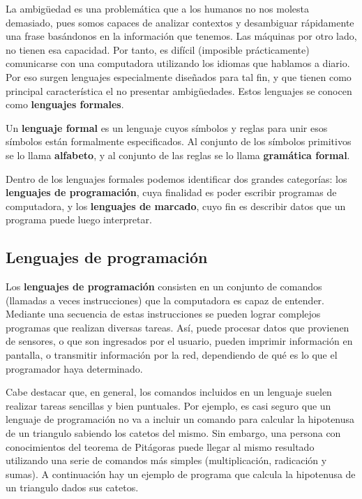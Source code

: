La ambigüedad es una problemática que a los humanos no nos molesta demasiado,
pues somos capaces de analizar contextos y desambiguar rápidamente una frase
basándonos en la información que tenemos. Las máquinas por otro lado, no tienen
esa capacidad. Por tanto, es difícil (imposible prácticamente) comunicarse con
una computadora utilizando los idiomas que hablamos a diario. Por eso surgen
lenguajes especialmente diseñados para tal fin, y que tienen como principal
característica el no presentar ambigüedades. Estos lenguajes se conocen como
\textbf{lenguajes formales}.

\begin{definition}
    Un \textbf{lenguaje formal} es un lenguaje cuyos símbolos y
    reglas para unir esos símbolos están formalmente especificados.
    Al conjunto de los símbolos primitivos se lo llama \textbf{alfabeto}, y
    al conjunto de las reglas se lo llama \textbf{gramática formal}.\autocite{sunitha_2015}
\end{definition}

Dentro de los lenguajes formales podemos identificar dos grandes categorías:
los \textbf{lenguajes de programación}, cuya finalidad es poder escribir programas de
computadora, y los \textbf{lenguajes de marcado}, cuyo fin es describir datos que un 
programa puede luego interpretar.

\subsection{Lenguajes de programación}

Los \textbf{lenguajes de programación} consisten en un conjunto de comandos (llamadas
a veces instrucciones) que la computadora es capaz de entender. Mediante una
secuencia de estas instrucciones se pueden lograr complejos programas que
realizan diversas tareas. Así, puede procesar datos que provienen de sensores,
o que son ingresados por el usuario, pueden imprimir información en pantalla,
o transmitir información por la red, dependiendo de qué es lo que el programador
haya determinado.

Cabe destacar que, en general, los comandos incluidos en un lenguaje suelen
realizar tareas sencillas y bien puntuales. Por ejemplo, es casi seguro que un
lenguaje de programación no va a incluir un comando para calcular la hipotenusa
de un triangulo sabiendo los catetos del mismo. Sin embargo, una persona con
conocimientos del teorema de Pitágoras puede llegar al mismo resultado utilizando
una serie de comandos más simples (multiplicación, radicación y sumas). A
continuación hay un ejemplo de programa que calcula la hipotenusa de un triangulo
dados sus catetos.

